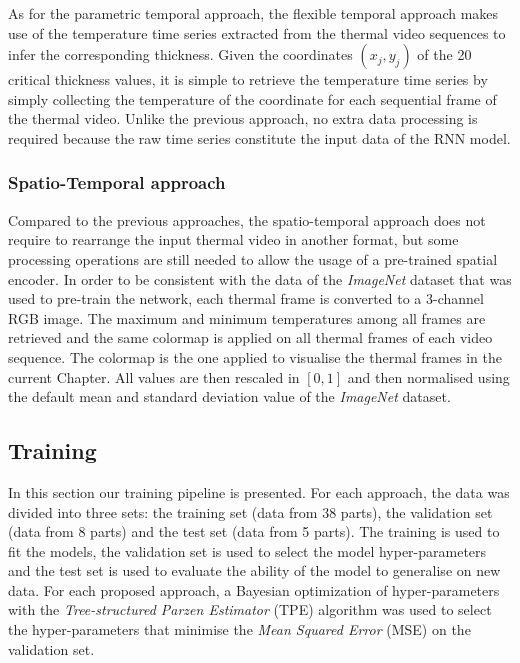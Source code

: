 As for the parametric temporal approach, the flexible temporal approach makes use of the temperature time series extracted from the thermal video sequences to infer the corresponding thickness. Given the coordinates $(x_j, y_j)$ of the 20 critical thickness values, it is simple to retrieve the temperature time series by simply collecting the temperature of the coordinate for each sequential frame of the thermal video. Unlike the previous approach, no extra data processing is required because the raw time series constitute the input data of the RNN model. 

\subsubsection{Spatio-Temporal approach}
Compared to the previous approaches, the spatio-temporal approach 
does not require to rearrange the input thermal video in another format, but some processing operations are still needed to allow the usage of a pre-trained spatial encoder. In order to be consistent with the data of the \textit{ImageNet} dataset \citep{deng2009imagenet} that was used  to pre-train the network, each thermal frame is converted to a 3-channel RGB image. The maximum and minimum temperatures among all frames are retrieved and the same colormap is applied on all thermal frames of each video sequence. The colormap is the one applied to visualise the thermal frames in the current Chapter. All values are then rescaled in $[0, 1]$ and then normalised using the default mean and standard deviation value of the \textit{ImageNet} dataset.

\subsection{Training}

In this section our training pipeline is presented. For each approach, the data was divided into three sets: the training set (data from 38 parts), the validation set (data from 8 parts) and the test set (data from 5 parts). The training is used to fit the models, the validation set is used to select the model hyper-parameters and the test set is used to evaluate the ability of the model to generalise on new data. For each proposed approach, a Bayesian optimization of hyper-parameters with the \textit{Tree-structured Parzen Estimator} (TPE) \citep{bergstra2011algorithms} algorithm was used to select the hyper-parameters that minimise the \textit{Mean Squared Error} (MSE) on the validation set.

